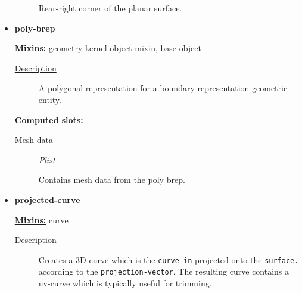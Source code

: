 \documentclass [11pt]{book}
\begin{document}
\begin{itemize}
\begin{description}
 Rear-right corner of the planar surface.




\end{description}







\item {}
\label{prim:poly-brep}
\textbf{poly-brep}


\textbf{
\underline{Mixins:}} geometry-kernel-object-mixin, base-object





\begin{description}

\item [
\underline{Description}]


A polygonal representation for a boundary representation geometric entity.



\end{description}








\textbf{
\underline{Computed slots:}}

\begin{description}

\item [Mesh-data]
\emph{Plist}

 Contains mesh data from the poly brep.




\end{description}







\item {}
\label{prim:projected-curve}
\textbf{projected-curve}


\textbf{
\underline{Mixins:}} curve





\begin{description}

\item [
\underline{Description}]


Creates a 3D curve which is the \texttt{curve-in} 
projected onto the \texttt{surface.} according to the \texttt{projection-vector}. 
The resulting curve contains a uv-curve which is typically useful for trimming.


\end{description}
\end{itemize}
\end{document}
